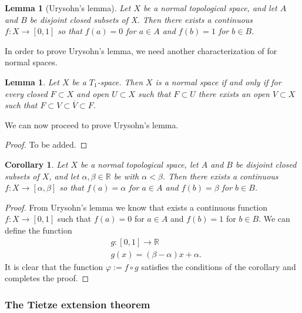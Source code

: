 \documentclass[11pt,a4paper]{article}
\theoremstyle{definition}
\theoremstyle{plain}
\newtheorem{lemma}[theorem]{Lemma}
\newtheorem{corollary}[theorem]{Corollary}
\newcommand{\R}{\mathbb{R}}
\begin{document}
  \begin{lemma}[Urysohn’s lemma]\label{lem:urysohn}
    Let $X$ be a normal topological space, 
    and let $A$ and $B$ be disjoint closed subsets of X.
    Then there exists a continuous $f \colon X \to [0,1]$
    so that $f(a) = 0$ for $a \in A$ and $f(b) = 1$ for $b \in B$.
  \end{lemma}

  In order to prove Urysohn's lemma, we need another characterization of
  for normal spaces.

  \begin{lemma}
    Let $X$ be a $T_1$-space. Then $X$ is a normal space if and only if
    for every closed $F \subset X$ and open $U \subset X$ such that
    $F \subset U$ there exists an open $V \subset X$ such that
    $F \subset V \subset \overline{V} \subset F$.
  \end{lemma}

  We can now proceed to prove Urysohn's lemma.

  \begin{proof}
    To be added.
  \end{proof}

  \begin{corollary}
    Let $X$ be a normal topological space, let $A$ and $B$ be disjoint closed 
    subsets of $X$, and let $\alpha, \beta \in \R$ be with $\alpha < \beta$.
    Then there exists a continuous $f \colon X \to [\alpha, \beta]$ 
    so that $f(a) = \alpha$ for $a \in A$ and $f(b) = \beta$ for $b \in B$.
  \end{corollary}

  \begin{proof}
    From Urysohn's lemma we know that exists a continuous function 
    $f \colon X \to [0,1]$ such that $f(a) = 0$ for $a \in A$ and
    $f(b) = 1$ for $b \in B$. We can define the function
    \begin{align*}
      &g \colon [0,1] \to \R \\
      &g(x) = (\beta - \alpha)x + \alpha.
    \end{align*}
    It is clear that the function $\varphi := f \circ g$ satisfies the
    conditions of the corollary and completes the proof.
  \end{proof}

  \subsubsection{The Tietze extension theorem}
\end{document}
